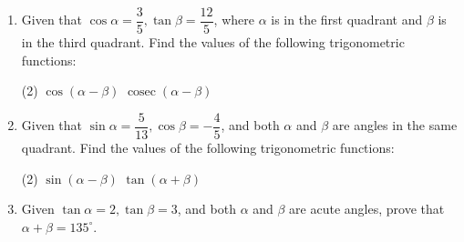 \documentclass{report}
\begin{document}
\begin{enumerate}
	\item Given that $\cos \alpha=\dfrac{3}{5}, \tan \beta=\dfrac{12}{5}$, where $\alpha$ is in the first quadrant and $\beta$ is in the third quadrant. Find the values of the following trigonometric functions:
	      \begin{tasks}[label=(\alph*)](2)
	      	\task $\cos (\alpha-\beta)$
	      	\task $\operatorname{cosec}(\alpha-\beta)$
	      \end{tasks}
	      
	\item Given that $\sin \alpha=\dfrac{5}{13}, \cos \beta=-\dfrac{4}{5}$, and both $\alpha$ and $\beta$ are angles in the same quadrant. Find the values of the following trigonometric functions:
	      \begin{tasks}[label=(\alph*)](2)
	      	\task $\sin (\alpha-\beta)$
	      	\task $\tan (\alpha+\beta)$
	      \end{tasks}
	      
	\item Given $\tan \alpha=2, \tan \beta=3$, and both $\alpha$ and $\beta$ are acute angles, prove that $\alpha+\beta=135^{\circ}$.
\end{enumerate}

\newpage
    
\end{document}
